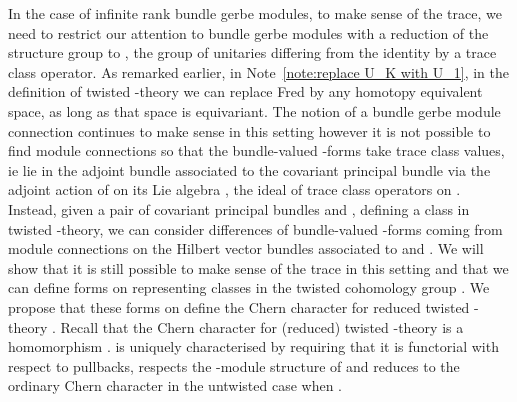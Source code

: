 \documentclass[a4paper,reqno]{amsart}
\theoremstyle{plain}
\theoremstyle{definition}
\theoremstyle{remark}
\numberwithin{equation}{section}
\numberwithin{figure}{section}
\providecommand{\<}{\langle}
\renewcommand{\>}{\rangle}
\providecommand{\ad}{\text{ad}}
\begin{document}
In the case of infinite rank bundle gerbe modules, to make 
sense of the trace, we need to restrict our attention to 
bundle gerbe modules with a reduction of the structure 
group to \coordHE{}, the group of unitaries differing from the 
identity by a trace class operator.  As remarked earlier, 
in Note~\ref{note:replace U_K with U_1}, 
in the definition of twisted \coordHE{}-theory 
we can replace Fred by any homotopy equivalent space, as 
long as that space is \coordHE{} equivariant.  
The notion of a bundle 
gerbe module connection continues to make sense in this 
setting however it is not possible to find module connections 
so that the bundle-valued \coordHE{}-forms \coordHE{} 
take trace class values, ie lie in the adjoint bundle 
\myHighlight{$\Omega^2 (\ad(P))$}\coordHE{} associated to the \coordHE{} covariant 
principal \coordHE{} bundle \coordHE{} via the adjoint action of 
\coordHE{} on its Lie algebra \coordHE{}, the ideal 
of trace class operators on \coordHE{}.  Instead, 
given a pair of \coordHE{} covariant principal 
\coordHE{} bundles \coordHE{} and \coordHE{}, defining a class in 
twisted \coordHE{}-theory, we can consider differences of 
bundle-valued \coordHE{}-forms \coordHE{} coming from module connections on the  
Hilbert vector bundles associated to \coordHE{} and \coordHE{}.  We will 
show that it is still possible to make sense of the 
trace in this setting and that we can define 
forms on \coordHE{} representing classes in the 
twisted cohomology group \coordHE{}.  We propose that 
these forms on \coordHE{} define the Chern character for reduced twisted 
\coordHE{}-theory \coordHE{}.  Recall that the Chern character for 
(reduced) twisted \coordHE{}-theory is a homomorphism \coordHE{}.  \coordHE{} is 
uniquely characterised by requiring that it is functorial 
with respect to pullbacks, respects the 
\coordHE{}-module structure of \coordHE{} 
and reduces to the ordinary Chern character in the 
untwisted case when \coordHE{}.  
      
\end{document}
